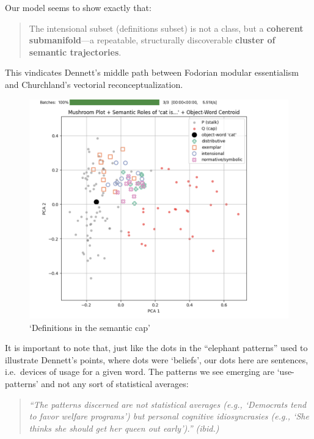 \documentclass[12pt]{article}
\providecommand{\pandocbounded}[1]{#1}   %
\begin{document}
Our model seems to show exactly that:

\begin{quote}
The intensional subset (definitions subset) is not a class, but a \textbf{coherent submanifold}---a repeatable, structurally discoverable \textbf{cluster of semantic trajectories}.
\end{quote}

This vindicates Dennett's middle path between Fodorian modular essentialism and Churchland's vectorial reconceptualization.

\begin{figure}
\centering
\pandocbounded{\includegraphics[keepaspectratio]{figures/definitions.png}}
\caption{`Definitions in the semantic cap'}
\end{figure}

It is important to note that, just like the dots in the ``elephant patterns'' used to illustrate Dennett's points, where dots were `beliefs', our dots here are sentences, i.e.~devices of usage for a given word. The patterns we see emerging are `use-patterns' and not any sort of statistical averages:

\begin{quote}
\emph{``The patterns discerned are not statistical averages (e.g., `Democrats tend to favor welfare programs') but personal cognitive idiosyncrasies (e.g., `She thinks she should get her queen out early').'' (ibid.)}
\end{quote}
\end{document}
